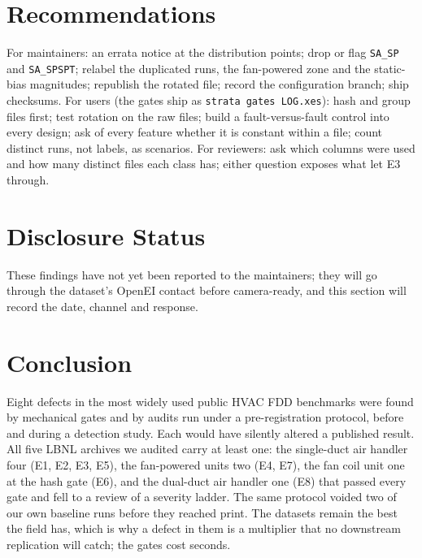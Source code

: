 \documentclass[runningheads]{llncs}
\begin{document}
\section{Recommendations}
\label{sec:recs}

For maintainers: an errata notice at the distribution points; drop or flag \texttt{SA\_SP} and \texttt{SA\_SPSPT}; relabel the duplicated runs, the fan-powered zone and the static-bias magnitudes; republish the rotated file; record the configuration branch; ship checksums. For users (the gates ship as \texttt{strata gates LOG.xes}): hash and group files first; test rotation on the raw files; build a fault-versus-fault control into every design; ask of every feature whether it is constant within a file; count distinct runs, not labels, as scenarios. For reviewers: ask which columns were used and how many distinct files each class has; either question exposes what let E3 through.

\section{Disclosure Status}
\label{sec:disclosure}
These findings have not yet been reported to the maintainers; they will go through the dataset's OpenEI contact before camera-ready, and this section will record the date, channel and response.

\section{Conclusion}
\label{sec:conclusion}

Eight defects in the most widely used public HVAC FDD benchmarks were found by mechanical gates and by audits run under a pre-registration protocol, before and during a detection study. Each would have silently altered a published result. All five LBNL archives we audited carry at least one: the single-duct air handler four (E1, E2, E3, E5), the fan-powered units two (E4, E7), the fan coil unit one at the hash gate (E6), and the dual-duct air handler one (E8) that passed every gate and fell to a review of a severity ladder. The same protocol voided two of our own baseline runs before they reached print. The datasets remain the best the field has, which is why a defect in them is a multiplier that no downstream replication will catch; the gates cost seconds.



\end{document}
